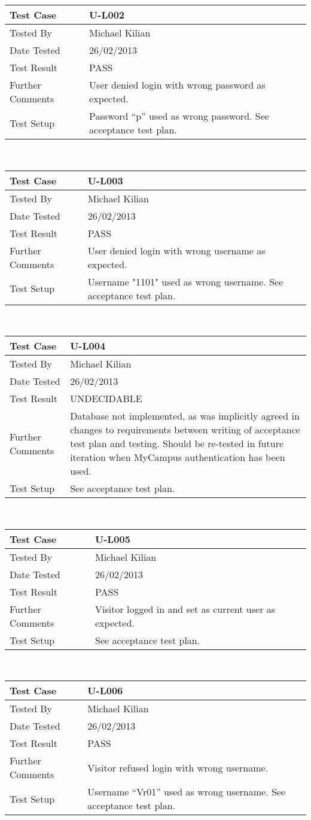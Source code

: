 \documentclass{l3deliverable}
\begin{document}
\begin{tabular}{lp{10cm}}
\hline 
\textbf{Test Case} & U-L002\tabularnewline
\hline 
\hline 
Tested By & Michael Kilian\tabularnewline
\hline 
Date Tested & 26/02/2013\tabularnewline
\hline 
Test Result & PASS\tabularnewline
\hline
Further Comments & User denied login with wrong password as expected. \tabularnewline
\hline
Test Setup & Password ``p'' used as wrong password. See acceptance test plan. \tabularnewline
\hline
\end{tabular}\\

\begin{tabular}{lp{10cm}}
\hline 
\textbf{Test Case} & U-L003\tabularnewline
\hline 
\hline 
Tested By & Michael Kilian\tabularnewline
\hline 
Date Tested & 26/02/2013\tabularnewline
\hline 
Test Result & PASS\tabularnewline
\hline
Further Comments & User denied login with wrong username as expected. \tabularnewline
\hline
Test Setup & Username "1101" used as wrong username. See acceptance test plan. \tabularnewline
\hline
\end{tabular}\\

\begin{tabular}{lp{10cm}}
\hline 
\textbf{Test Case} & U-L004\tabularnewline
\hline 
\hline 
Tested By & Michael Kilian\tabularnewline
\hline 
Date Tested & 26/02/2013\tabularnewline
\hline 
Test Result & UNDECIDABLE\tabularnewline
\hline
Further Comments & Database not implemented, as was implicitly agreed in changes to requirements between writing of acceptance test plan and testing. Should be re-tested in future iteration when MyCampus authentication has been used. \tabularnewline
\hline
Test Setup & See acceptance test plan. \tabularnewline
\hline
\end{tabular}\\

\begin{tabular}{lp{10cm}}
\hline 
\textbf{Test Case} & U-L005\tabularnewline
\hline 
\hline 
Tested By & Michael Kilian\tabularnewline
\hline 
Date Tested & 26/02/2013\tabularnewline
\hline 
Test Result & PASS\tabularnewline
\hline
Further Comments & Visitor logged in and set as current user as expected. \tabularnewline
\hline
Test Setup & See acceptance test plan. \tabularnewline
\hline
\end{tabular}\\

\begin{tabular}{lp{10cm}}
\hline 
\textbf{Test Case} & U-L006\tabularnewline
\hline 
\hline 
Tested By & Michael Kilian\tabularnewline
\hline 
Date Tested & 26/02/2013\tabularnewline
\hline 
Test Result & PASS\tabularnewline
\hline
Further Comments &  Visitor refused login with wrong username. \tabularnewline
\hline
Test Setup & Username ``Vr01'' used as wrong username. See acceptance test plan. \tabularnewline
\hline
\end{tabular}\\
\end{document}

